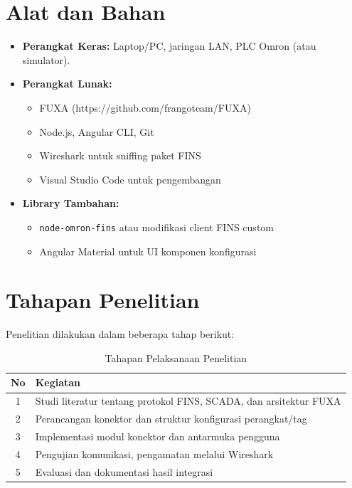 \section{Alat dan Bahan}
\begin{itemize}
    \item \textbf{Perangkat Keras:} Laptop/PC, jaringan LAN, PLC Omron (atau simulator).
    \item \textbf{Perangkat Lunak:} 
    \begin{itemize}
        \item FUXA (https://github.com/frangoteam/FUXA)
        \item Node.js, Angular CLI, Git
        \item Wireshark untuk sniffing paket FINS
        \item Visual Studio Code untuk pengembangan
    \end{itemize}
    \item \textbf{Library Tambahan:} 
    \begin{itemize}
        \item \texttt{node-omron-fins} atau modifikasi client FINS custom
        \item Angular Material untuk UI komponen konfigurasi
    \end{itemize}
\end{itemize}

\section{Tahapan Penelitian}
Penelitian dilakukan dalam beberapa tahap berikut:

\begin{table}[H]
\centering
\begin{tabular}{|c|p{8cm}|}
\hline
\textbf{No} & \textbf{Kegiatan} \\
\hline
1 & Studi literatur tentang protokol FINS, SCADA, dan arsitektur FUXA \\
2 & Perancangan konektor dan struktur konfigurasi perangkat/tag \\
3 & Implementasi modul konektor dan antarmuka pengguna \\
4 & Pengujian komunikasi, pengamatan melalui Wireshark \\
5 & Evaluasi dan dokumentasi hasil integrasi \\
\hline
\end{tabular}
\caption{Tahapan Pelaksanaan Penelitian}
\end{table}


